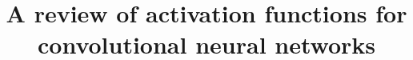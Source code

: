 \documentclass[technote,a4paper,leqno]{IEEEtran}
\title{A review of activation functions for convolutional neural networks}
\author{%
    \IEEEauthorblockN{Martin Thoma}\\
    \IEEEauthorblockA{E-Mail: info@martin-thoma.de} %
}
\begin{document}
\maketitle




\printglossaries%

\end{document}
